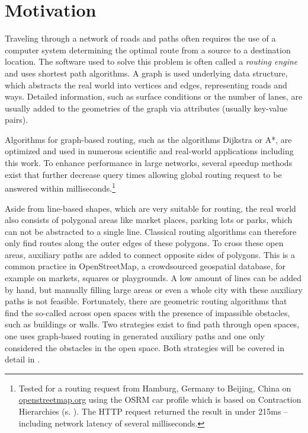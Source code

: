 
\section{Motivation}
	
	Traveling through a network of roads and paths often requires the use of a computer system determining the optimal route from a source to a destination location.
	The software used to solve this problem is often called a \emph{routing engine} and uses shortest path algorithms.
	A graph is used underlying data structure, which abstracts the real world into vertices and edges, representing roads and ways.
	Detailed information, such as surface conditions or the number of lanes, are usually added to the geometries of the graph via attributes (usually key-value pairs).
	
	Algorithms for graph-based routing, such as the algorithms Dijkstra or A*, are optimized and used in numerous scientific and real-world applications including this work.
	To enhance performance in large networks, several speedup methods exist that further decrease query times allowing global routing request to be answered within milliseconds.\footnote{Tested for a routing request from Hamburg, Germany to Beijing, China on \href{https://www.openstreetmap.org/directions?engine=fossgis\_osrm\_car&route=53.55\%2C10.00\%3B39.91\%2C116.39}{openstreetmap.org} using the OSRM car profile which is based on Contraction Hierarchies (s. ). The HTTP request returned the result in under 215ms -- including network latency of several milliseconds.}
	
	Aside from line-based shapes, which are very suitable for routing, the real world also consists of polygonal areas like market places, parking lots or parks, which can not be abstracted to a single line.
	Classical routing algorithms can therefore only find routes along the outer edges of these polygons.
	To cross these open areas, auxiliary paths are added to connect opposite sides of polygons.
	This is a common practice in OpenStreetMap, a crowdsourced geospatial database, for example on markets, squares or playgrounds.
	A low amount of lines can be added by hand, but manually filling large areas or even a whole city with these auxiliary paths is not feasible.
	Fortunately, there are geometric routing algorithms that find the so-called  across open spaces with the presence of impassible obstacles, such as buildings or walls.
	Two strategies exist to find path through open spaces, one uses graph-based routing in generated auxiliary paths and one only considered the obstacles in the open space.
	Both strategies will be covered in detail in .
	
